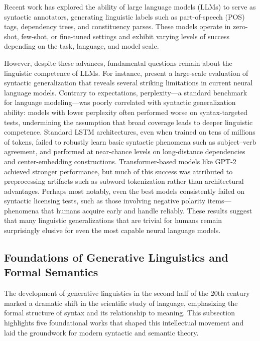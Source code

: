 Recent work has explored the ability of large language models (LLMs) to serve as syntactic annotators, generating linguistic labels such as part-of-speech (POS) tags, dependency trees, and constituency parses. These models operate in zero-shot, few-shot, or fine-tuned settings and exhibit varying levels of success depending on the task, language, and model scale.

However, despite these advances, fundamental questions remain about the linguistic competence of LLMs. For instance, \citet{hu2020systematic} present a large-scale evaluation of syntactic generalization that reveals several striking limitations in current neural language models. Contrary to expectations, perplexity—a standard benchmark for language modeling—was poorly correlated with syntactic generalization ability: models with lower perplexity often performed worse on syntax-targeted tests, undermining the assumption that broad coverage leads to deeper linguistic competence. Standard LSTM architectures, even when trained on tens of millions of tokens, failed to robustly learn basic syntactic phenomena such as subject–verb agreement, and performed at near-chance levels on long-distance dependencies and center-embedding constructions. Transformer-based models like GPT-2 achieved stronger performance, but much of this success was attributed to preprocessing artifacts such as subword tokenization rather than architectural advantages. Perhaps most notably, even the best models consistently failed on syntactic licensing tests, such as those involving negative polarity items—phenomena that humans acquire early and handle reliably. These results suggest that many linguistic generalizations that are trivial for humans remain surprisingly elusive for even the most capable neural language models.

\subsection{Foundations of Generative Linguistics and Formal Semantics}

The development of generative linguistics in the second half of the 20th century marked a dramatic shift in the scientific study of language, emphasizing the formal structure of syntax and its relationship to meaning. This subsection highlights five foundational works that shaped this intellectual movement and laid the groundwork for modern syntactic and semantic theory.

